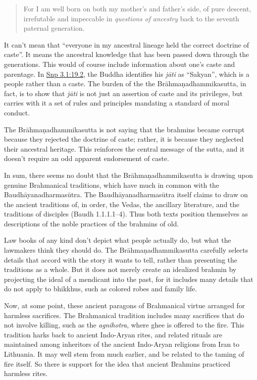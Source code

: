 \documentclass[12pt,openany]{book}%
\begin{document}
\begin{quotation}%
For I am well born on both my mother’s and father’s side, of pure descent, irrefutable and impeccable in \emph{questions of ancestry} back to the seventh paternal generation.

%
\end{quotation}

It can’t mean that “everyone in my ancestral lineage held the correct doctrine of caste”. It means the ancestral knowledge that has been passed down through the generations. This would of course include information about one’s caste and parentage. In \href{https://suttacentral.net/snp3.1/en/sujato\#19.2}{Snp 3.1:19.2}, the Buddha identifies his \textit{\textsanskrit{jāti}} as “Sakyan”, which is a people rather than a caste. The burden of the the \textsanskrit{Brāhmaṇadhammikasutta}, in fact, is to show that \textit{\textsanskrit{jāti}} is not just an assertion of caste and its privileges, but carries with it a set of rules and principles mandating a standard of moral conduct.

The \textsanskrit{Brāhmaṇadhammikasutta} is not saying that the brahmins became corrupt because they rejected the doctrine of caste; rather, it is because they neglected their ancestral heritage. This reinforces the central message of the sutta, and it doesn’t require an odd apparent endorsement of caste.

In sum, there seems no doubt that the \textsanskrit{Brāhmaṇadhammikasutta} is drawing upon genuine Brahmanical traditions, which have much in common with the \textsanskrit{Baudhāyanadharmasūtra}. The \textsanskrit{Baudhāyanadharmasūtra} itself claims to draw on the ancient traditions of, in order, the Vedas, the ancillary literature, and the traditions of disciples (Baudh 1.1.1.1–4). Thus both texts position themselves as descriptions of the noble practices of the brahmins of old.

Law books of any kind don’t depict what people actually do, but what the lawmakers think they should do. The \textsanskrit{Brāhmaṇadhammikasutta} carefully selects details that accord with the story it wants to tell, rather than presenting the traditions as a whole. But it does not merely create an idealized brahmin by projecting the ideal of a mendicant into the past, for it includes many details that do not apply to bhikkhus, such as colored robes and family life.

Now, at some point, these ancient paragons of Brahmanical virtue arranged for harmless sacrifices. The Brahmanical tradition includes many sacrifices that do not involve killing, such as the \textit{agnihotra}, where ghee is offered to the fire. This tradition harks back to ancient Indo-Aryan rites, and related rituals are maintained among inheritors of the ancient Indo-Aryan religions from Iran to Lithuania. It may well stem from much earlier, and be related to the taming of fire itself. So there is support for the idea that ancient Brahmins practiced harmless rites.
\end{document}
